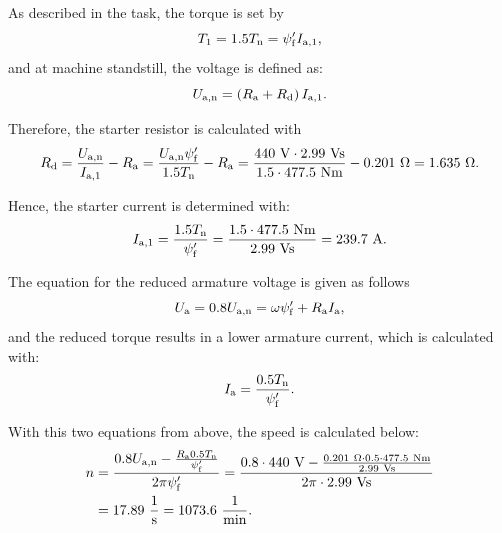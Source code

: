\begin{solutionblock}
	As described in the task, the torque is set by
	\begin{equation}
		T_{\mathrm{1}} = 1.5 \Tn = \psi_{\mathrm{f}}' I_{\mathrm{a,1}},
	\end{equation}
	and at machine standstill, the voltage is defined as:
	\begin{equation}
		U_{\mathrm{a,n}} = \left(\Ra + R_{\mathrm{d}} \right) I_{\mathrm{a,1}}.
	\end{equation}

	Therefore, the starter resistor is calculated with
	\begin{equation}
		R_{\mathrm{d}} = \frac{U_{\mathrm{a,n}}}{I_{\mathrm{a,1}}} - \Ra
		= \frac{U_{\mathrm{a,n}} \psi_{\mathrm{f}}'}{1.5 \Tn}-\Ra
		= \frac{440 \ \si{V} \cdot 2.99 \ \si{Vs}}{1.5 \cdot 477.5 \ \si{Nm}}-0.201 \ \si{\Omega}
		= 1.635 \ \si{\Omega}.
	\end{equation}

	Hence, the starter current is determined with:
	\begin{equation}
		I_{\mathrm{a,1}} = \frac{1.5 \Tn}{\psi_{\mathrm{f}}'}
		= \frac{1.5 \cdot 477.5 \ \si{Nm}}{2.99 \ \si{Vs}}
		= 239.7 \ \si{A}.
	\end{equation}

\end{solutionblock}


\begin{solutionblock}
	The equation for the reduced armature voltage is given as follows
	\begin{equation}
		U_{\mathrm{a}} = 0.8 U_{\mathrm{a,n}}
		= \omega \psi_{\mathrm{f}}' + \Ra I_{\mathrm{a}},
	\end{equation}
	and the reduced torque results in a lower armature current, which is calculated with:
	\begin{equation}
		I_{\mathrm{a}} = \frac{0.5 \Tn}{\psi_{\mathrm{f}}'}.
	\end{equation}

	With this two equations from above, the speed is calculated below:
	\begin{align}
		\begin{split}
			n & = \frac{0.8 U_{\mathrm{a,n}} - \frac{\Ra 0.5 \Tn}{\psi_{\mathrm{f}}'}}{2 \pi \psi_{\mathrm{f}}'}
			= \frac{0.8 \cdot 440 \ \si{V} - \frac{0.201 \ \si{\Omega} \cdot 0.5 \cdot 477.5 \ \si{Nm}}{2.99 \ \si{Vs}}}{2 \pi \cdot 2.99 \ \si{Vs}} \\
			  & = 17.89 \ \si{\frac{1}{s}}
			= 1073.6 \ \si{\frac{1}{min}}.
		\end{split}
	\end{align}

\end{solutionblock}

